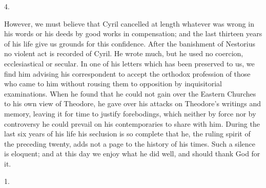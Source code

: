 4.

However, we must believe that Cyril cancelled at length whatever
was wrong in his words or his deeds by good works in compensation; and
the last thirteen years of his life give us grounds for this
confidence. After the banishment of Nestorius no violent act is
recorded of Cyril. He wrote much, but he used no coercion,
ecclesiastical or secular. In one of his letters which has been
preserved to us, we find him advising his correspondent to accept the
orthodox profession of those who came to him without rousing them to
opposition by inquisitorial examinations. When he found that he could
not gain over the Eastern Churches to his own view of Theodore,
he gave over his attacks on Theodore's writings and memory, leaving it
for time to justify forebodings, which neither by force nor by
controversy he could prevail on his contemporaries to share with him.
During the last six years of his life his seclusion is so complete
that he, the ruling spirit of the preceding twenty, adds not a page to
the history of his times. Such a silence is eloquent; and at this day
we enjoy what he did well, and should thank God for it.


1.

